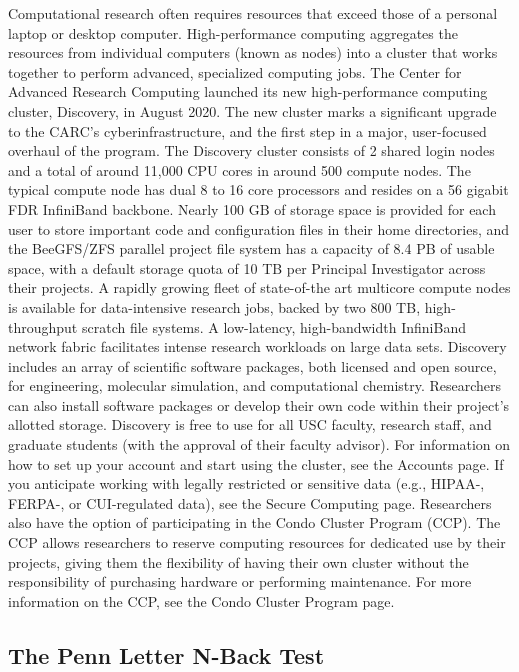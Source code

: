 \documentclass[%
numbers=noendperiod,
parskip=half,
bibliography=totoc,
,
]{scrartcl}
\begin{document}
Computational research often requires resources that exceed those of a personal
laptop or desktop computer. High-performance computing aggregates the resources
from individual computers (known as nodes) into a cluster that works together to
perform advanced, specialized computing jobs. The Center for Advanced Research
Computing launched its new high-performance computing cluster, Discovery, in
August 2020. The new cluster marks a significant upgrade to the CARC's
cyberinfrastructure, and the first step in a major, user-focused overhaul of the
program. The Discovery cluster consists of 2 shared login nodes and a total of
around 11,000 CPU cores in around 500 compute nodes. The typical compute node
has dual 8 to 16 core processors and resides on a 56 gigabit FDR InfiniBand
backbone. Nearly 100 GB of storage space is provided for each user to store
important code and configuration files in their home directories, and the
BeeGFS/ZFS parallel project file system has a capacity of 8.4 PB of usable
space, with a default storage quota of 10 TB per Principal Investigator across
their projects. A rapidly growing fleet of state-of-the art multicore compute
nodes is available for data-intensive research jobs, backed by two 800 TB,
high-throughput scratch file systems. A low-latency, high-bandwidth InfiniBand
network fabric facilitates intense research workloads on large data sets.
Discovery includes an array of scientific software packages, both licensed and
open source, for engineering, molecular simulation, and computational chemistry.
Researchers can also install software packages or develop their own code within
their project's allotted storage. Discovery is free to use for all USC faculty,
research staff, and graduate students (with the approval of their faculty
advisor). For information on how to set up your account and start using the
cluster, see the Accounts page. If you anticipate working with legally
restricted or sensitive data (e.g., HIPAA-, FERPA-, or CUI-regulated data), see
the Secure Computing page. Researchers also have the option of participating in
the Condo Cluster Program (CCP). The CCP allows researchers to reserve computing
resources for dedicated use by their projects, giving them the flexibility of
having their own cluster without the responsibility of purchasing hardware or
performing maintenance. For more information on the CCP, see the Condo Cluster
Program page.

\hypertarget{the-penn-letter-n-back-test}{%
\subsection{The Penn Letter N-Back Test}\label{the-penn-letter-n-back-test}}
\end{document}
